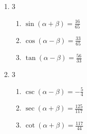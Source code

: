 \documentclass{ximera}
\begin{document}
\begin{enumerate}
\begin{multicols}{2}
\end{multicols}

\item \begin{multicols}{3}

\begin{enumerate}

\item $\sin(\alpha + \beta) = \frac{16}{65}$
\item $\cos(\alpha - \beta) = \frac{33}{65}$
\item $\tan(\alpha - \beta) = \frac{56}{33}$

\end{enumerate}

\end{multicols}

 

\item \begin{multicols}{3}

\begin{enumerate}

\item $\csc(\alpha - \beta) = -\frac{5}{4}$
\item $\sec(\alpha + \beta) = \frac{125}{117}$
\item $\cot(\alpha + \beta) = \frac{117}{44}$

\end{enumerate}

\end{multicols}

\setcounter{HW}{\value{enumi}}

\end{enumerate}
\end{document}
